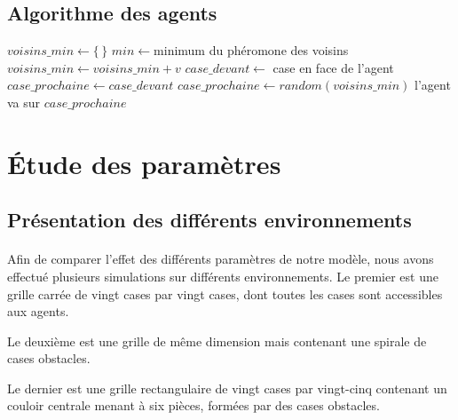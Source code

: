 \documentclass{article}
\begin{document}
    \subsection{Algorithme des agents}
    \begin{algorithmic}
            \STATE $voisins\_min \gets \{\,\}$
            \STATE $min \gets $minimum du phéromone des voisins
                    \STATE $voisins\_min \gets voisins\_min + v$
                \ENDIF
            \ENDFOR
            \STATE $case\_devant \gets$ case en face de l'agent
                \STATE  $case\_prochaine \gets case\_devant$
            \ELSE
                \STATE $case\_prochaine \gets random(voisins\_min)$
            \ENDIF
            \STATE l'agent va sur $case\_prochaine$
        \ENDFOR
    \end{algorithmic}
\section{Étude des paramètres}
    \subsection{Présentation des différents environnements}
        \paragraph{} Afin de comparer l'effet des différents paramètres de notre modèle, nous avons effectué plusieurs simulations sur différents environnements.
        Le premier est une grille carrée de vingt cases par vingt cases, dont toutes les cases sont accessibles aux agents.

        Le deuxième est une grille de même dimension mais contenant une spirale de cases obstacles.

        Le dernier est une grille rectangulaire de vingt cases par vingt-cinq contenant un couloir centrale menant à six pièces, formées par des cases obstacles.
        
\end{document}
